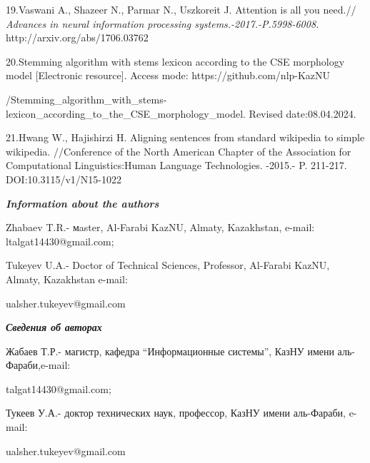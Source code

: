 \begin{noparindent}
19.Vaswani A., Shazeer N., Parmar N., Uszkoreit J. Attention is all you
need.// \emph{Advances in neural information processing
systems.-2017.-P.5998-6008.} http://arxiv.org/abs/1706.03762

20.Stemming algorithm with stems lexicon according to the CSE morphology
model {[}Electronic resource{]}. Access mode:
https://github.com/nlp-KazNU

/Stemming\_algorithm\_with\_stems-lexicon\_according\_to\_the\_CSE\_morphology\_model.
Revised date:08.04.2024.

\label{kix.87gpl39zxgv2}{}21.Hwang W., Hajishirzi H.
Aligning sentences from standard wikipedia to simple wikipedia.
//Conference of the North American Chapter of the Association for
Computational Linguistics:Human Language Technologies. -2015.- P.
211-217. DOI:10.3115/v1/N15-1022
\end{noparindent}

\emph{{\bfseries Information about the authors}}

\begin{noparindent}
Zhabaev T.R.- мaster, Al-Farabi KazNU, Almaty, Kazakhstan, e-mail:
ltalgat14430@gmail.com;

Tukeyev U.A.- Doctor of Technical Sciences, Professor, Al-Farabi KazNU,
Almaty, Kazakhstan e-mail:

ualsher.tukeyev@gmail.com
\end{noparindent}

\emph{{\bfseries Сведения об авторах}}

\begin{noparindent}
Жабаев Т.Р.- магистр, кафедра ``Информационные системы'', КазНУ имени
аль-Фараби,e-mail:

talgat14430@gmail.com;

Тукеев У.А.- доктор технических наук, профессор, КазНУ имени аль-Фараби,
e-mail:

ualsher.tukeyev@gmail.com
\end{noparindent}
